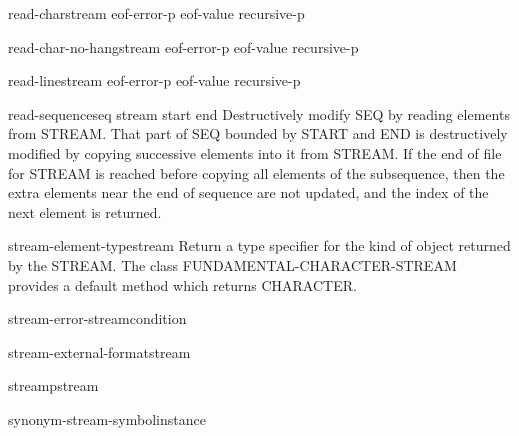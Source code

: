 \begin{function}{read-char}{\op stream eof-error-p eof-value recursive-p}{}{}
  
\end{function}

\begin{function}{read-char-no-hang}{\op stream eof-error-p eof-value recursive-p}{}{}
  
\end{function}

\begin{function}{read-line}{\op stream eof-error-p eof-value recursive-p}{}{}
  
\end{function}

\begin{function}{read-sequence}{seq stream \key start end}{}{}
  Destructively modify SEQ by reading elements from STREAM.
  That part of SEQ bounded by START and END is destructively modified by
  copying successive elements into it from STREAM. If the end of file
  for STREAM is reached before copying all elements of the subsequence,
  then the extra elements near the end of sequence are not updated, and
  the index of the next element is returned.
\end{function}

\begin{function}{stream-element-type}{stream}{}{}
  Return a type specifier for the kind of object returned by the
  STREAM. The class FUNDAMENTAL-CHARACTER-STREAM provides a default method
  which returns CHARACTER.
\end{function}

\begin{function}{stream-error-stream}{condition}{}{}
  
\end{function}

\begin{function}{stream-external-format}{stream}{}{}
  
\end{function}

\begin{function}{streamp}{stream}{}{}
  
\end{function}

\begin{function}{synonym-stream-symbol}{instance}{}{}
  
\end{function}

